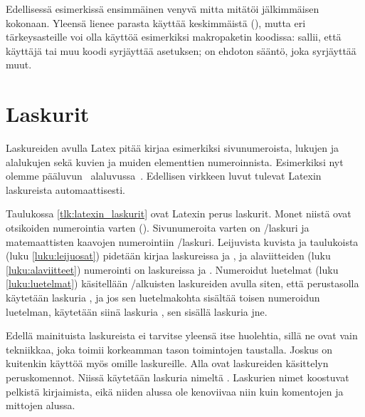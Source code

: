 Edellisessä esimerkissä ensimmäinen venyvä mitta  mitätöi
jälkimmäisen  kokonaan. Yleensä lienee parasta käyttää
keskimmäistä (), mutta eri tär\-keys\-as\-teil\-le voi olla
käyttöä esimerkiksi makropaketin koodissa:  sallii, että
käyttäjä tai muu koodi syrjäyttää asetuksen;  on ehdoton
sääntö, joka syrjäyttää muut.

\section{Laskurit}

Laskureiden avulla Latex pitää kirjaa esimerkiksi sivunumeroista,
lukujen ja alalukujen sekä kuvien ja muiden elementtien numeroinnista.
Esimerkiksi nyt olemme pääluvun~
alaluvussa~. Edellisen virkkeen luvut tulevat Latexin
laskureista automaattisesti.


Taulukossa \ref{tlk:latexin_laskurit} ovat Latexin perus laskurit. Monet
niistä ovat otsikoiden numerointia varten (). Sivunumeroita
varten on \-/laskuri ja matemaattisten kaavojen
numerointiin \-/laskuri. Leijuvista kuvista ja
taulukoista (luku \ref{luku:leijuosat}) pidetään kirjaa laskureissa
 ja , ja alaviitteiden (luku
\ref{luku:alaviitteet}) numerointi on laskureissa  ja
. Numeroidut luetelmat (luku \ref{luku:luetelmat})
käsitellään \-/alkuisten laskureiden avulla siten, että
perustasolla käytetään laskuria , ja jos sen luetelmakohta
sisältää toisen numeroidun luetelman, käytetään siinä laskuria
, sen sisällä laskuria  jne.

Edellä mainituista laskureista ei tarvitse yleensä itse huolehtia, sillä
ne ovat vain tekniikkaa, joka toimii korkeamman tason toimintojen
taustalla. Joskus on kuitenkin käyttöä myös omille laskureille. Alla
ovat laskureiden käsittelyn peruskomennot. Niissä käytetään laskuria
nimeltä . Laskurien nimet koostuvat pelkistä kirjaimista,
eikä niiden alussa ole kenoviivaa niin kuin komentojen ja mittojen
alussa.

